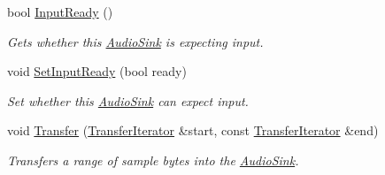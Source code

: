 \begin{DoxyCompactItemize}
bool \hyperlink{classAudioSink_a9b3dbe861acd4bb7ac1903730a0a01f3}{Input\+Ready} ()
\begin{DoxyCompactList}\small\item\em Gets whether this \hyperlink{classAudioSink}{Audio\+Sink} is expecting input. \end{DoxyCompactList}\item 
void \hyperlink{classAudioSink_aaa92237f7ab548c1a898981f4dcd631c}{Set\+Input\+Ready} (bool ready)
\begin{DoxyCompactList}\small\item\em Set whether this \hyperlink{classAudioSink}{Audio\+Sink} can expect input. \end{DoxyCompactList}\item 
void \hyperlink{classAudioSink_a455e211f4f16eaa21e7b75412cc8a8ae}{Transfer} (\hyperlink{classAudioSink_a60c1743d66e02b77f04791e72fa4cd0b}{Transfer\+Iterator} \&start, const \hyperlink{classAudioSink_a60c1743d66e02b77f04791e72fa4cd0b}{Transfer\+Iterator} \&end)
\begin{DoxyCompactList}\small\item\em Transfers a range of sample bytes into the \hyperlink{classAudioSink}{Audio\+Sink}. \end{DoxyCompactList}\end{DoxyCompactItemize}
